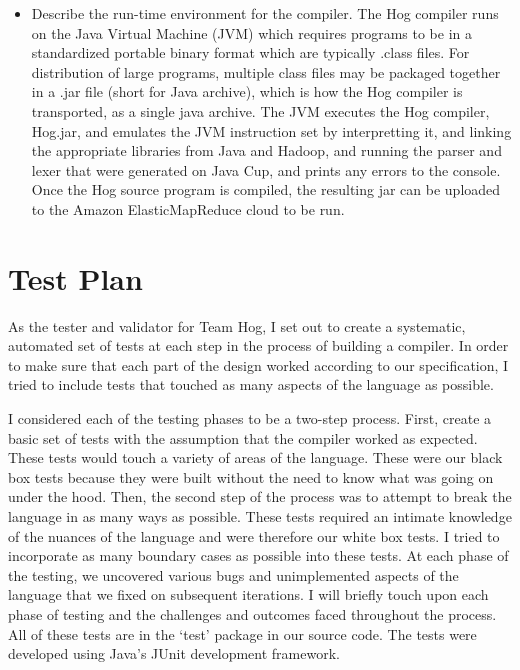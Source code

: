 \documentclass{report}
\begin{document}
\begin{itemize}
\item Describe the run-time environment for the compiler.
	The Hog compiler runs on the Java Virtual Machine (JVM) which requires programs to be in a standardized portable binary format which are typically .class files. For distribution of large programs,
multiple class files may be packaged together in a .jar file (short for Java archive), which is how the Hog
compiler is transported, as a single java archive.  The JVM executes the Hog compiler, Hog.jar, and emulates
the JVM instruction set by interpretting it, and linking the appropriate libraries from Java and Hadoop, and running the parser and lexer that were generated on Java Cup, and prints any errors to the console. Once the 
Hog source program is compiled, the resulting jar can be uploaded to the Amazon ElasticMapReduce cloud to be run. 

\end{itemize}

\chapter{Test Plan}
\label{chap:test}

As the tester and validator for Team Hog, I set out to create a systematic, automated set of tests at each step in the process of building a compiler. In order to make sure that each part of the design worked according to our specification, I tried to include tests that touched as many aspects of the language as possible. 

I considered each of the testing phases to be a two-step process. First, create a basic set of tests with the assumption that the compiler worked as expected. These tests would touch a variety of areas of the language. These were our black box tests because they were built without the need to know what was going on under the hood. Then, the second step of the process was to attempt to break the language in as many ways as possible. These tests required an intimate knowledge of the nuances of the language and were therefore our white box tests. I tried to incorporate as many boundary cases as possible into these tests. At each phase of the testing, we uncovered various bugs and unimplemented aspects of the language that we fixed on subsequent iterations. I will briefly touch upon each phase of testing and the challenges and outcomes faced throughout the process. All of these tests are in the ‘test’ package in our source code. The tests were developed using Java’s JUnit development framework.
\end{document}
